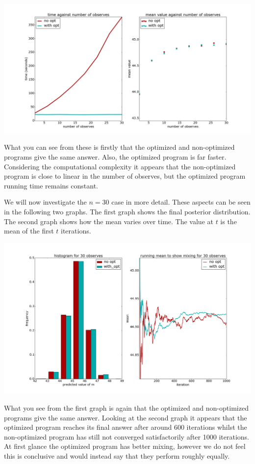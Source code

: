 \documentclass[a4paper]{article}
\begin{document}
\centerline{\includegraphics[width=16cm]{images/merging_observes_1.png}}

What you can see from these is firstly that the optimized and non-optimized programs give the same answer. Also, the optimized program is far faster. Considering the computational complexity it appears that the non-optimized program is close to linear in the number of observes, but the optimized program running time remains constant.

We will now investigate the \(n = 30\) case in more detail. These aspects can be seen in the following two graphs. The first graph shows the final posterior distribution. The second graph shows how the mean varies over time. The value at \(t\) is the mean of the first \(t\) iterations.

\centerline{\includegraphics[width=16cm]{images/merging_observes_2.png}}

What you see from the first graph is again that the optimized and non-optimized programs give the same answer. Looking at the second graph it appears that the optimized program reaches its final answer after around 600 iterations whilst the non-optimized program has still not converged satisfactorily after 1000 iterations. At first glance the optimized program has better mixing, however we do not feel this is conclusive and would instead say that they perform roughly equally.
\end{document}
